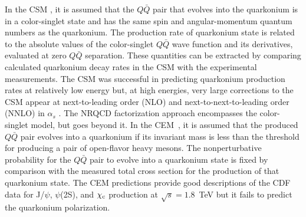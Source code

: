 \documentclass[aps,prc,preprint,superscriptaddress,showpacs,showkeys,amsmath]{revtex4-1}
\begin{document}
  In the CSM \cite{Einhorn:1975ua,Ellis:1976fj,Carlson:1976cd,Berger:1980ni},
it is assumed that the $Q\bar Q$ pair that evolves into
the quarkonium is in a color-singlet state and has the same spin
and angular-momentum quantum numbers as the quarkonium. 
 The production rate of quarkonium state is related to 
the absolute values of the color-singlet $Q\bar Q$ wave function and 
its derivatives, evaluated at zero $Q\bar Q$ separation. These quantities 
can be extracted by comparing calculated quarkonium decay
rates in the CSM with the experimental measurements. 
 The CSM was successful in predicting quarkonium production rates at
relatively low energy \cite{Schuler:1994hy} but, at high
energies, very large corrections to the CSM appear at next-to-leading
order (NLO) and next-to-next-to-leading order (NNLO) in $\alpha_s$
\cite{Artoisenet:2007xi,Campbell:2007ws,Artoisenet:2008fc}.
 The NRQCD factorization approach encompasses the color-singlet model, 
but goes beyond it.
    In the CEM~\cite{Fritzsch:1977ay,Amundson:1995em,Amundson:1996qr}, it
is assumed that the produced $Q\bar Q$ pair evolves into a quarkonium
if its invariant mass is less than the threshold for producing a 
pair of open-flavor heavy mesons. 
 The nonperturbative probability for the $Q\bar Q$ pair to evolve into 
a quarkonium state is fixed by comparison with the measured total 
cross section for the production of that quarkonium state.
 The CEM predictions provide good descriptions of the CDF data for J/$\psi$,
$\psi$(2S), and $\chi_{\rm c}$ production at $\sqrt{s}=1.8$~TeV
\cite{Amundson:1996qr} but it fails to predict the quarkonium 
polarization.

\end{document}
